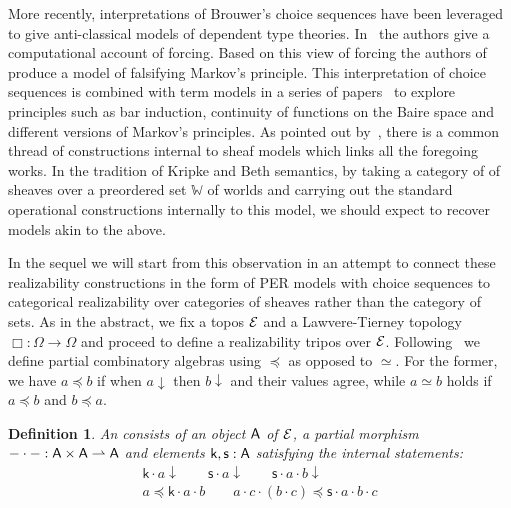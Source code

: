 \documentclass{easychair}
\newtheorem{defn}[thrm]{Definition}
\begin{document}
More recently, interpretations of Brouwer's choice sequences have been leveraged
to give anti-classical models of dependent type theories.
%
In~\cite{coquandComputationalInterpretationForcing2012} the authors give a
computational account of forcing.
%
Based on this view of forcing the authors
of~\cite{coquandIndependenceMarkovsPrinciple2017} produce a model of \MLTT{}
falsifying Markov's principle.
%
This interpretation of choice sequences is combined with term models in a series
of papers~\cite{bickfordComputabilityChurchTuringChoice2018,
  bickfordOpenBarBrouwerian2021, cohenSeparatingMarkovsPrinciples2024,
  rahliValidatingBrouwersContinuity2018, forsterMarkovsPrinciplesConstructive}
to explore principles such as bar induction, continuity of functions on the
Baire space and different versions of Markov's principles.
%
As pointed out by~\cite{sterlingHigherOrderFunctions2021}, there is a common
thread of constructions internal to sheaf models which links all the foregoing
works.
%
In the tradition of Kripke and Beth semantics, by taking a category of of
sheaves over a preordered set \(\mathbb{W}\) of worlds and carrying out
the standard operational constructions internally to this model, we should
expect to recover models akin to the above.

In the sequel we will start from this observation in an attempt to connect these
realizability constructions in the form of PER models with choice sequences to
categorical realizability over categories of sheaves rather than the category of
sets.
%
As in the abstract, we fix a topos \(\mathcal{E}\) and a Lawvere-Tierney topology
\(\Box : \Omega \to \Omega\) and proceed to define a realizability tripos over
\(\mathcal{E}\).
%
Following~\cite{faberEffectiveOperationsType2016} we define partial combinatory
algebras using \(\preccurlyeq\) as opposed to \(\simeq\).
%
For the former, we have \(a \preccurlyeq b\) if when \(a \downarrow\) then
\(b \downarrow\) and their values agree, while \(a \simeq b\) holds if
\(a \preccurlyeq b\) and \(b \preccurlyeq a\).

\begin{defn}
  An  consists of
  an object \(\mathsf{A}\) of \(\mathcal{E}\), a partial morphism
  \(-\cdot-:\mathsf{A} \times \mathsf{A} \rightharpoonup \mathsf{A}\) and elements
  \(\mathsf{k},\mathsf{s} : \mathsf{A}\) satisfying the internal
  statements:
  \[\begin{array}{c}
      \mathsf{k} \cdot a \downarrow \qquad
      \mathsf{s} \cdot a \downarrow \qquad
      \mathsf{s} \cdot a \cdot b \downarrow \\
      a \preccurlyeq \mathsf{k} \cdot a \cdot b \qquad
      a \cdot c \cdot (b \cdot c) \preccurlyeq \mathsf{s} \cdot a \cdot b \cdot c
  \end{array}\]
\end{defn}
\end{document}
